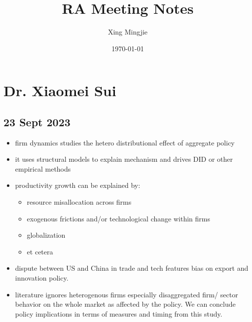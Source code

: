 \usepackage{sectsty}
\allsectionsfont{\rmfamily\bfseries\upshape} %

\usepackage[nottoc,notlof,notlot]{tocbibind} %
\usepackage[titles,subfigure]{tocloft} %
\renewcommand{\cftsecfont}{\rmfamily\mdseries\upshape}
\renewcommand{\cftsecpagefont}{\rmfamily\mdseries\upshape} %

\usepackage[colorlinks,citecolor=black,urlcolor=black,bookmarks=false,hypertexnames=true]{hyperref} 




\title{RA Meeting Notes}
\author{Xing Mingjie}
\date{\today} %


\maketitle

\tableofcontents

\newpage

\section{Dr. Xiaomei Sui}
	\subsection{23 Sept 2023}
		\begin{itemize}
		\item firm dynamics studies the hetero distributional effect of aggregate policy
		\item it uses structural models to explain mechanism and drives DID or other empirical methods
		\item productivity growth can be explained by:
			\begin{itemize}
			\item resource misallocation across firms
			\item exogenous frictions and/or technological change within firms
			\item globalization
			\item et cetera
			\end{itemize}
		\item dispute between US and China in trade and tech features bias on export and innovation policy.
		\item literature ignores heterogenous firms especially disaggregated firm/ sector behavior on the whole market as affected by the policy. We can conclude policy implications in terms of measures and timing from this study.
		\end{itemize}
